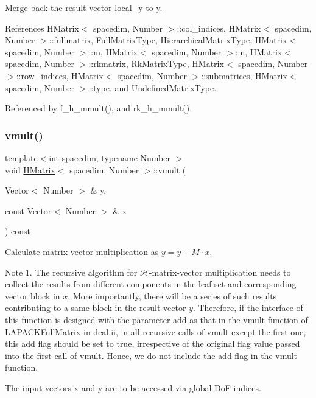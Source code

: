 Merge back the result vector {\ttfamily local\+\_\+y} to {\ttfamily y}.

References H\+Matrix$<$ spacedim, Number $>$\+::col\+\_\+indices, H\+Matrix$<$ spacedim, Number $>$\+::fullmatrix, Full\+Matrix\+Type, Hierarchical\+Matrix\+Type, H\+Matrix$<$ spacedim, Number $>$\+::m, H\+Matrix$<$ spacedim, Number $>$\+::n, H\+Matrix$<$ spacedim, Number $>$\+::rkmatrix, Rk\+Matrix\+Type, H\+Matrix$<$ spacedim, Number $>$\+::row\+\_\+indices, H\+Matrix$<$ spacedim, Number $>$\+::submatrices, H\+Matrix$<$ spacedim, Number $>$\+::type, and Undefined\+Matrix\+Type.



Referenced by f\+\_\+h\+\_\+mmult(), and rk\+\_\+h\+\_\+mmult().

\mbox{\label{classHMatrix_aa11b5761aba86606effd14b4bdf31912}} 
\subsubsection{\texorpdfstring{vmult()}{vmult()}}
{\footnotesize\ttfamily template$<$int spacedim, typename Number $>$ \\
void \hyperlink{classHMatrix}{H\+Matrix}$<$ spacedim, Number $>$\+::vmult (\begin{DoxyParamCaption}\item[{Vector$<$ Number $>$ \&}]{y,  }\item[{const Vector$<$ Number $>$ \&}]{x }\end{DoxyParamCaption}) const}

Calculate matrix-\/vector multiplication as $y = y + M \cdot x$.


\begin{DoxyDescription}
\item[Note ]1. The recursive algorithm for $\mathcal{H}$-\/matrix-\/vector multiplication needs to collect the results from different components in the leaf set and corresponding vector block in $x$. More importantly, there will be a series of such results contributing to a same block in the result vector $y$. Therefore, if the interface of this function is designed with the parameter {\ttfamily add} as that in the {\ttfamily vmult} function of {\ttfamily L\+A\+P\+A\+C\+K\+Full\+Matrix} in deal.\+ii, in all recursive calls of {\ttfamily vmult} except the first one, this {\ttfamily add} flag should be set to {\ttfamily true}, irrespective of the original flag value passed into the first call of {\ttfamily vmult}. Hence, we do not include the {\ttfamily add} flag in the {\ttfamily vmult} function.
\begin{DoxyEnumerate}
\item The input vectors {\ttfamily x} and {\ttfamily y} are to be accessed via global DoF indices. 
\end{DoxyEnumerate}
\end{DoxyDescription}



